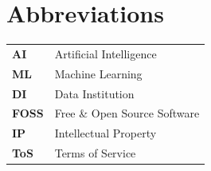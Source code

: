 \chapter*{Abbreviations}

\begin{center}
    \renewcommand{\arraystretch}{1.5}
    \begin{tabular}{>{\bfseries}l l}
        AI & Artificial Intelligence \\
        ML & Machine Learning \\
        DI & Data Institution \\
        FOSS & Free \& Open Source Software \\
        IP & Intellectual Property \\
        ToS & Terms of Service \\
        
    \end{tabular}
\end{center}